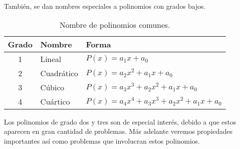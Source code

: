 También, se dan nombres especiales a polinomios con grados bajos.
\begin{table}[H]
    \centering
    \begin{tabular}{c l l}
        \hline
        Grado & Nombre & Forma \\
        \hline \hline
        1 & Lineal & $P(x) = a_1 x + a_0$\\
        2 & Cuadrático & $P(x) = a_2 x^2 + a_1 x + a_0$\\
        3 & Cúbico & $P(x) = a_3 x^3 + a_2 x^2 + a_1 x + a_0$\\
        4 & Cuártico & $P(x) = a_4 x^4 + a_3 x^3 + a_2 x^2 + a_1 x + a_0$\\
        \hline
    \end{tabular}
    \caption{Nombre de polinomios comunes.}
\end{table}
Los polinomios de grado dos y tres son de especial interés, debido a que estos aparecen en gran cantidad de problemas.
Más adelante veremos propiedades importantes así como problemas que involucran estos polinomios.

